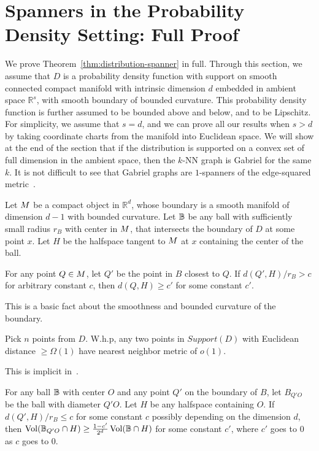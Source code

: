 \section{Spanners in the Probability Density Setting: Full
  Proof}\label{ap:distribution-spanner}

We prove Theorem~\ref{thm:distribution-spanner} in full.
Through this section, we assume that $D$ is a probability density
function with support on smooth connected compact manifold with intrinsic dimension
$d$ embedded in ambient space $\mathbb{R}^s$, 
with smooth boundary of bounded curvature. This
probability density function is further assumed to be bounded
above and below, and to be Lipschitz. For simplicity, we assume that
$s=d$, and we can prove all our results when $s > d$ by taking
coordinate charts from the manifold into Euclidean space.  We
will show at the end of the section that if the distribution is
supported on a convex set of full dimension in the ambient space,
then the $k$-NN graph is Gabriel for the same $k$. It is not
difficult to see that Gabriel graphs are $1$-spanners of the
edge-squared metric~\cite{SridharMaster}.

\begin{lemma}
  Let $M$ be a compact object in $\mathbb{R}^d$, whose
  boundary is a smooth manifold of dimension $d-1$ with bounded
  curvature.
  Let $\mathbb{B}$ be any ball with sufficiently small radius
  $r_B$ with center in $M$, that intersects the boundary of $D$
  at some point $x$.
  Let $H$ be the halfspace tangent to $M$ at $x$ containing the center
  of the ball.

For any point $Q \in M$, let $Q'$ be the point in $B$
closest to $Q$. If $d(Q', H) / r_B > c$ for arbitrary constant $c$,
then $d(Q, H) \geq c'$ for some constant $c'$.
\end{lemma}

This is a basic fact about the smoothness and bounded curvature
of the boundary.

\begin{lemma} Pick $n$ points from $D$. W.h.p, any two points in
  $Support(D)$ with Euclidean distance $ \geq \Omega(1)$ 
  have nearest neighbor metric of $o(1)$.
\end{lemma}

This is implicit in~\cite{hwang2016}.
\begin{lemma} For any ball $\mathbb{B}$ with center $O$ and any point $Q'$ on the
  boundary of $B$, let $B_{Q'O}$ be the ball with diameter $Q'O$.
  Let $H$ be any halfspace containing $O$.
  If $d(Q', H) / r_B \leq c$ for some constant
  $c$ possibly depending on the dimension $d$, then
  $\operatorname{Vol}(\mathbb{B}_{Q'O} \cap H) \geq \frac{1-c'}{2^d} \operatorname{Vol}(\mathbb{B} \cap H)$
  for some
  constant $c'$, where $c'$ goes to $0$ as $c$ goes to $0$.
\end{lemma}

